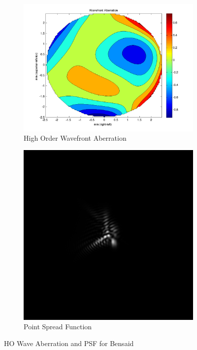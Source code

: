 \documentclass{article}
\begin{document}
\clearpage

\begin{figure}[H]
\begin{subfigure}{.5\textwidth}
  \centering
  \includegraphics[width=1\linewidth]{Bensaid_WFA.png}
  \caption{High Order Wavefront Aberration}
  \label{fig:bensaidhowa}
\end{subfigure}%
\begin{subfigure}{.5\textwidth}
  \centering
  \includegraphics[width=.8\linewidth]{Bensaid_PSF.png}
  \caption{Point Spread Function}
  \label{fig:bensaidpsf}
\end{subfigure}
\caption{HO Wave Aberration and PSF for Bensaid}
\label{fig:bensaid}
\end{figure}
\end{document}
